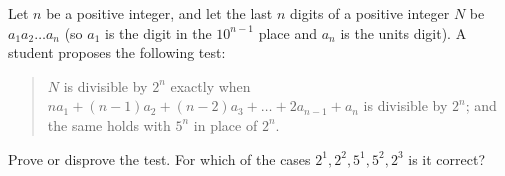 Let $n$ be a positive integer, and let the last $n$ digits of a positive integer $N$ be $a_1a_2\ldots a_n$ (so $a_1$ is the digit in the $10^{n-1}$ place and $a_n$ is the units digit). A student proposes the following test:
\begin{quote}
$N$ is divisible by $2^n$ exactly when $n a_1+(n-1)a_2+(n-2)a_3+\dots+2a_{n-1}+a_n$ is divisible by $2^n$; and the same holds with $5^n$ in place of $2^n$.
\end{quote}
Prove or disprove the test. For which of the cases $2^1,2^2,5^1,5^2,2^3$ is it correct?
